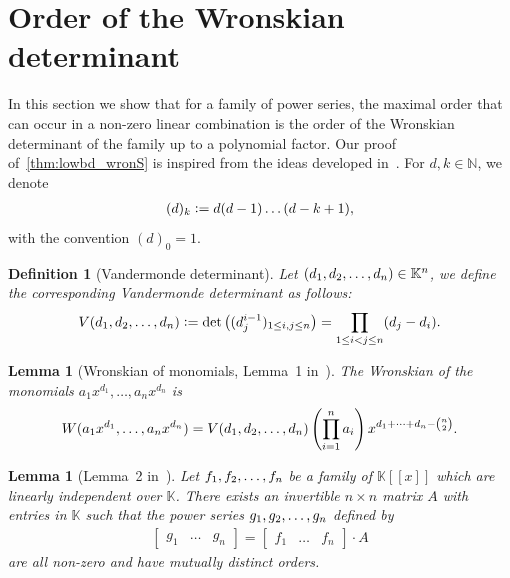 \documentclass[a4paper, 11pt,dvipsnames]{article}
\newtheorem{definition}{Definition}
\newtheorem{lemma}[theorem]{Lemma}
\newcommand{\eqdef}{\vcentcolon =}
\newcommand{\BK}{\mathbb{K}}
\begin{document}
  \section{Order of the Wronskian determinant} \label{sec:wronskian}

  In this section we show that for a family of power series, the maximal order that can occur in a non-zero linear combination is the order of the Wronskian determinant of the family up to a polynomial factor.	Our proof of~\cref{thm:lowbd_wronS} is inspired from the ideas developed in~\cite{bostan2010wronskians}. For $d, k \in \mathbb{N}$, we denote \begin{align*} (d)_{k} \eqdef d(d-1)\dots (d-k+1), \end{align*} with the convention $(d)_0 = 1$.
\begin{definition} [Vandermonde determinant] Let $(\lst d n) \in \BK^{n}$, we define the corresponding Vandermonde determinant as follows: \begin{align*} V(\lst
  d n) \eqdef \det 
\left((d_j^{i-1})_{1 \le i,j \le n }\right) = \prod_{1 \le i < j \le n} (d_j - d_i).  \end{align*} \end{definition} 
\begin{lemma} [Wronskian of monomials, Lemma~1 in~\cite{bostan2010wronskians}] The Wronskian of the monomials $a_1x^{d_1}, \dots , a_n x^{d_n}$ is
  \begin{align*} W(a_1x^{d_1}, \dots , a_n x^{d_n}) = V(d_{1},d_{2},\dots,d_{n}) \left(\prod_{i=1}^n a_i \right) x^{d_1 + \dots + d_n - \binom{n}{2}}.  \end{align*}
\label{lemma:wronmonom} \end{lemma}

\begin{lemma} [Lemma~2 in~\cite{bostan2010wronskians}] Let $f_{1},f_{2},\dots,f_{n}$ be a family of   $\BK[[x]]$ which are linearly independent over $\BK$. There
  exists an invertible $n \times n$ matrix $A$ with entries in $\BK$ such that the power series $g_{1},g_{2},\dots,g_{n}$ defined by \begin{align} \begin{bmatrix} g_1 & \dots
  & g_n \end{bmatrix} = \begin{bmatrix} f_1 & \dots & f_n \end{bmatrix} \cdot A \label{eq:distinctorder} \end{align} are all non-zero and have mutually distinct
  orders.  \label{lemma:distinctorder} \end{lemma}
\end{document}
